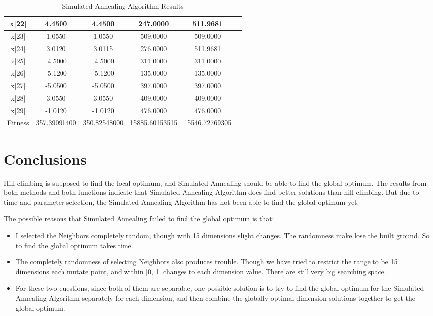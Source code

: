 \documentclass{article}
\begin{document}
\begin{CJK}{UTF8}{gbsn}
\begin{table}[!hbp]
\begin{tabular}{|c|c|c|c|c|c|}
\hline
x[22]	&	 4.4500	&	 4.4500	&	 247.0000	&	 511.9681	\\
\hline
x[23]	&	 1.0550	&	 1.0550	&	 509.0000	&	 509.0000	\\
\hline
x[24]	&	 3.0120	&	 3.0115	&	 276.0000	&	 511.9681	\\
\hline
x[25]	&	-4.5000	&	-4.5000	&	 311.0000	&	 311.0000	\\
\hline
x[26]	&	-5.1200	&	-5.1200	&	 135.0000	&	 135.0000	\\
\hline
x[27]	&	-5.0500	&	-5.0500	&	 397.0000	&	 397.0000	\\
\hline
x[28]	&	 3.0550	&	 3.0550	&	 409.0000	&	 409.0000	\\
\hline
x[29]	&	-1.0120	&	-1.0120	&	 476.0000	&	 476.0000	\\
\hline
\hline
Fitness &  357.39091400 &  350.82548000 &  15885.60153515        & 15546.72769305        \\
\hline
\hline
\end{tabular}
\caption{Simulated Annealing Algorithm Results} 
\end{table}

\newpage
\section{Conclusions}
\indent
Hill climbing is supposed to find the local optimum, and Simulated Annealing should be able to find the global optimum. The results from both methods and both functions indicate that Simulated Annealing Algorithm does find better solutions than hill climbing. But due to time and parameter selection, the Simulated Annealing Algorithm has not been able to find the global optimum yet. 

The possible reasons that Simulated Annealing failed to find the global optimum is that: 
\begin{itemize}
\itemsep=-3pt
\item I selected the Neighbors completely random, though with 15 dimensions slight changes. The randomness make lose the built ground. So to find the global optimum takes time. 

\item The completely randomness of selecting Neighbors also produces trouble. Though we have tried to restrict the range to be 15 dimensions each mutate point, and within [0, 1] changes to each dimension value. There are still very big searching space. 

\item For these two questions, since both of them are separable, one possible solution is to try to find the global optimum for the Simulated Annealing Algorithm separately for each dimension, and then combine the globally optimal dimension solutions together to get the global optimum. 
\end{itemize}

\end{CJK}
\end{document}
